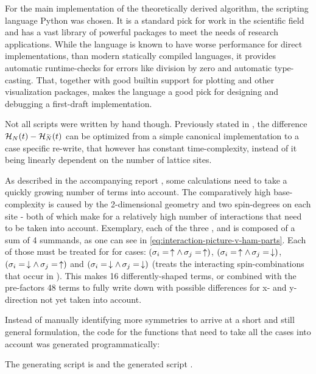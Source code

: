 For the main implementation of the theoretically derived algorithm, the scripting language Python was chosen.
It is a standard pick for work in the scientific field and has a vast library of powerful packages to meet the needs of research applications.
While the language is known to have worse performance for direct implementations, than modern statically compiled languages, it provides automatic runtime-checks for errors like division by zero and automatic type-casting.
That, together with good builtin support for plotting and other visualization packages, makes the language a good pick for designing and debugging a first-draft implementation.

Not all scripts were written by hand though.
Previously stated in , the difference $\HNOft - \HNOft[\vphantom{N}\smash{\tilde{N}}]$ can be optimized from a simple canonical implementation to a case specific re-write, that however has constant time-complexity, instead of it being linearly dependent on the number of lattice sites.

As described in the accompanying report , some calculations need to take a quickly growing number of terms into account.
The comparatively high base-complexity is caused by the 2-dimensional geometry and two spin-degrees on each site - both of which make for a relatively high number of interactions that need to be taken into account.
Exemplary, each of the three ,  and  is composed of a sum of 4 summands, as one can see in \autoref{eq:interaction-picture-v-ham-parts}.
Each of those must be treated for for cases: $(\sigma_i = \,\uparrow \land \,\sigma_j = \,\uparrow)$, $(\sigma_i = \,\uparrow \land \,\sigma_j = \,\downarrow)$, $(\sigma_i = \,\downarrow \land \,\sigma_j = \,\uparrow)$ and $(\sigma_i = \,\downarrow \land \,\sigma_j = \,\downarrow)$ (treats the interacting spin-combinations that occur in ). %
This makes 16 differently-shaped terms, or combined with the pre-factors 48 terms to fully write down with possible differences for x- and y-direction not yet taken into account.

Instead of manually identifying more symmetries to arrive at a short and still general formulation, the code for the functions that need to take all the cases into account was generated programmatically:

The generating script is  and the generated script .

